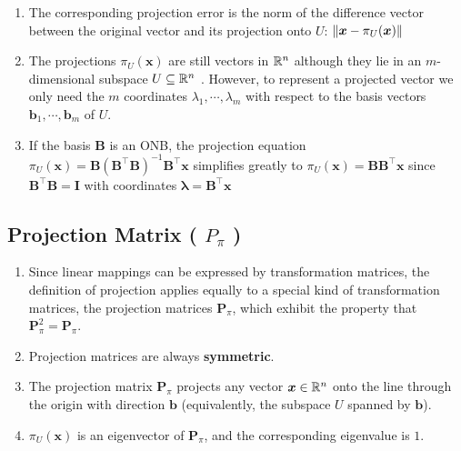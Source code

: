 \begin{enumerate}
    \item 
    \begin{definition}
        The corresponding projection error is the norm of the difference vector between the original vector and its projection onto $U$: 
        $
            \left\| \bm{x} - \pi_U(\bm{x}) \right\|
        $
        \hfill \cite{mfml/book/mml/Deisenroth-Faisal-Ong}
    \end{definition}

    \item The projections $\pi_U (\bm{x})$ are still vectors in $\mathbb{R}^n$ although they lie in an $m$-dimensional subspace $U \subseteq \mathbb{R}^n$ . 
    However, to represent a projected vector we only need the $m$ coordinates $\lambda_1, \cdots , \lambda_m$ with respect to the basis vectors $\bm{b}_1, \cdots , \bm{b}_m$ of $U$.
    \hfill \cite{mfml/book/mml/Deisenroth-Faisal-Ong}

    \item If the basis $\bm{B}$ is an ONB, the projection equation 
    $
        \pi_U (\bm{x}) 
        = \bm{B} (\bm{B}^\top \bm{B})^{-1} \bm{B}^\top \bm{x}
    $
    simplifies greatly to $ \pi_U (\bm{x}) = \bm{B}\bm{B}^\top \bm{x}$ since $\bm{B}^\top \bm{B} = \bm{I}$ with coordinates $\bm{\lambda} = \bm{B}^\top \bm{x} $
\end{enumerate}



\subsection{Projection Matrix ( $P_\pi$ )}

\begin{enumerate}
    \item Since linear mappings can be expressed by transformation matrices, the definition of projection applies equally to a special kind  of transformation matrices, the projection matrices $\bm{P}_\pi$, which exhibit the property that $\bm{P}^2_\pi = \bm{P}_\pi$.
    \hfill \cite{mfml/book/mml/Deisenroth-Faisal-Ong}

    \item Projection matrices are always \textbf{symmetric}.
    \hfill \cite{mfml/book/mml/Deisenroth-Faisal-Ong}

    \item The projection matrix $\bm{P}_ \pi$ projects any vector $\bm{x} \in \mathbb{R}^n$ onto the line through the origin with direction $\bm{b}$ (equivalently, the subspace $U$ spanned by $\bm{b}$).
    \hfill \cite{mfml/book/mml/Deisenroth-Faisal-Ong}

    \item $\pi_U (\bm{x})$ is an eigenvector of $\bm{P}_\pi$, and the corresponding eigenvalue is $1$.
    \hfill \cite{mfml/book/mml/Deisenroth-Faisal-Ong}
\end{enumerate}



